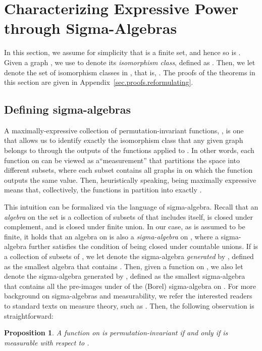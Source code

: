 \documentclass{article}
\newtheorem{proposition}{Proposition}
\begin{document}
\section{Characterizing Expressive Power through Sigma-Algebras}
\label{sec.sigma}
In this section, we assume for simplicity that  is a finite set, and hence so is . Given a graph , we use  to denote its \emph{isomorphism class}, defined as . Then, we let  denote the set of isomorphism classes in , that is, 
. The proofs of the theorems in this section are given in Appendix~\ref{sec.proofs.reformulating}.
\subsection{Defining sigma-algebras}

A maximally-expressive collection of permutation-invariant functions, , is one that allows us to identify exactly the isomorphism class  that any given graph  belongs to through the outputs of the functions  applied to . 
In other words, each function on  can be viewed as a``measurement'' that partitions the space  into different subsets, where each subset contains all graphs in  on which the function outputs the same value. Then, heuristically speaking,  being maximally expressive means that, collectively, the functions in  partition  into exactly .

This intuition can be formalized via the language of sigma-algebra. Recall that an \emph{algebra} on the set  is a collection of subsets of  that includes  itself, is closed under complement, and is closed under finite union. In our case, as  is assumed to be finite, it holds that an algebra on  is also a \emph{sigma-algebra} on , where a sigma-algebra further satisfies the condition of being closed under countable unions. If  is a collection of subsets of , we let  denote the sigma-algebra \emph{generated} by , defined as the smallest algebra that contains . Then, given a function  on , we also let  denote the sigma-algebra generated by , defined as the smallest sigma-algebra that contains all the pre-images under  of the (Borel) sigma-algebra on . For more background on sigma-algebras and measurability, we refer the interested readers to standard texts on measure theory, such as \cite{bartle2014elements}.
Then, the following observation is straightforward:
\begin{proposition}
\label{prop:measurable}
A function  on  is permutation-invariant if and only if  is measurable with respect to .
\end{proposition}
\end{document}
